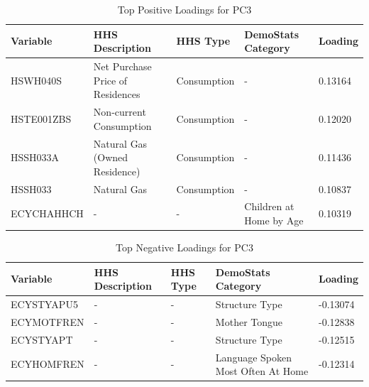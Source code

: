 \documentclass{article}
\begin{document}
\begin{table}[H]
\centering
\caption{Top Positive Loadings for PC3}
\label{tab:pc3_pos}
\begin{tabular}{@{}lllll@{}}
\toprule
Variable & HHS Description & HHS Type & DemoStats Category & Loading \\
\midrule
HSWH040S & Net Purchase Price of Residences & Consumption & - & 0.13164 \\
HSTE001ZBS & Non-current Consumption & Consumption & - & 0.12020 \\
HSSH033A & Natural Gas (Owned Residence) & Consumption & - & 0.11436 \\
HSSH033 & Natural Gas & Consumption & - & 0.10837 \\
ECYCHAHHCH & - & - & Children at Home by Age & 0.10319 \\
\bottomrule
\end{tabular}
\end{table}

\begin{table}[H]
\centering
\caption{Top Negative Loadings for PC3}
\label{tab:pc3_neg}
\begin{tabular}{@{}lllll@{}}
\toprule
Variable & HHS Description & HHS Type & DemoStats Category & Loading \\
\midrule
ECYSTYAPU5 & - & - & Structure Type & -0.13074 \\
ECYMOTFREN & - & - & Mother Tongue & -0.12838 \\
ECYSTYAPT & - & - & Structure Type & -0.12515 \\
ECYHOMFREN & - & - & Language Spoken Most Often At Home & -0.12314 \\
\bottomrule
\end{tabular}
\end{table}
\end{document}
